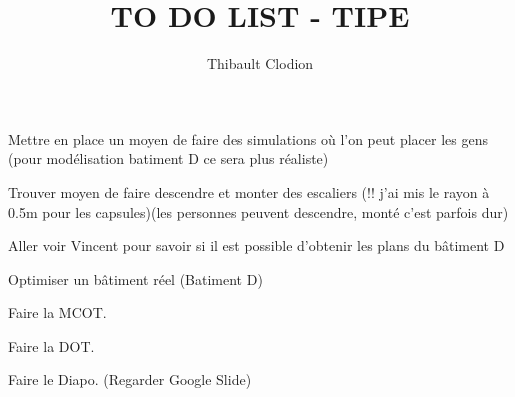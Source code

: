 \documentclass{article}
\title{TO DO LIST - TIPE}
\author{Thibault Clodion}
\newcommand{\cmark}{\ding{51}}%
\newcommand{\done}{\rlap{$\square$}{\raisebox{2pt}{\large\hspace{1pt}\cmark}}%
\hspace{-2.5pt}}
\begin{document}
\maketitle %

\begin{todolist}
    \item[\done] Mettre en place un moyen de faire des simulations où l'on peut placer les gens (pour modélisation batiment D ce sera plus réaliste)
    \item[\done] Trouver moyen de faire descendre et monter des escaliers (!! j'ai mis le rayon à 0.5m pour les capsules)(les personnes peuvent descendre,
    monté c'est parfois dur)
    \item Aller voir Vincent pour savoir si il est possible d'obtenir les plans du bâtiment D
    \item Optimiser un bâtiment réel (Batiment D)
    \item Faire la MCOT.
    \item Faire la DOT.
    \item Faire le Diapo. (Regarder Google Slide)
\end{todolist}
\end{document}
